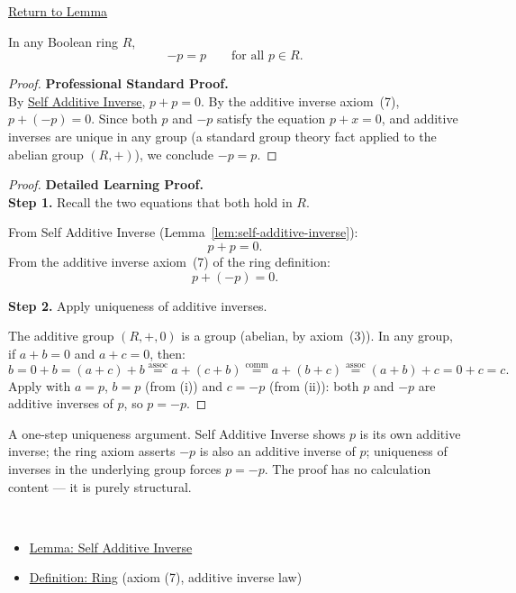 \newpage
{}
\label{prf:self-negation}

\begin{remark*}[Return]
\hyperref[lem:self-negation]{Return to Lemma}
\end{remark*}

\begin{lemma*}
In any Boolean ring $R$,
\[
-p = p \qquad \text{for all } p \in R.
\]
\end{lemma*}

\begin{proof}
\textbf{Professional Standard Proof.}~\\
By \hyperref[lem:self-additive-inverse]{Self Additive Inverse}, $p + p = 0$.
By the additive inverse axiom~(7), $p + (-p) = 0$.
Since both $p$ and $-p$ satisfy the equation $p + x = 0$, and additive
inverses are unique in any group (a standard group theory fact applied to
the abelian group $(R,+)$), we conclude $-p = p$.
\end{proof}

\begin{proof}
\textbf{Detailed Learning Proof.}~\\

\textbf{Step 1.} Recall the two equations that both hold in $R$.

From Self Additive Inverse (Lemma~\ref{lem:self-additive-inverse}):
\[
p + p = 0. \tag{i}
\]
From the additive inverse axiom~(7) of the ring definition:
\[
p + (-p) = 0. \tag{ii}
\]

\textbf{Step 2.} Apply uniqueness of additive inverses.

The additive group $(R,+,0)$ is a group (abelian, by axiom~(3)). In any
group, if $a + b = 0$ and $a + c = 0$, then:
\[
b = 0 + b = (a + c) + b \overset{\text{assoc}}{=} a + (c + b)
\overset{\text{comm}}{=} a + (b + c) \overset{\text{assoc}}{=} (a+b)+c = 0+c = c.
\]
Apply with $a = p$, $b = p$ (from (i)) and $c = -p$ (from (ii)):
both $p$ and $-p$ are additive inverses of $p$, so $p = -p$.
\end{proof}

\begin{remark*}
A one-step uniqueness argument. Self Additive Inverse shows $p$ is its
own additive inverse; the ring axiom asserts $-p$ is also an additive
inverse of $p$; uniqueness of inverses in the underlying group forces
$p = -p$. The proof has no calculation content --- it is purely structural.
\end{remark*}

\begin{remark*}[Dependencies]~\\
\begin{itemize}
  \item \hyperref[lem:self-additive-inverse]{Lemma: Self Additive Inverse}
  \item \hyperref[def:ring]{Definition: Ring} (axiom (7), additive inverse law)
\end{itemize}
\end{remark*}
